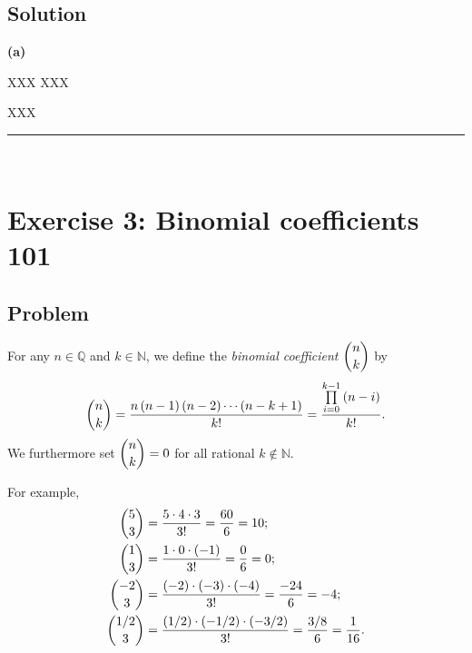 \documentclass[paper=a4, fontsize=12pt]{scrartcl} %
\newcommand{\QQ}{\mathbb{Q}} %
\newcommand{\NN}{\mathbb{N}} %
\newcommand{\tup}[1]{\left( #1 \right)}
\newcommand{\horrule}[1]{\rule{\linewidth}{#1}} %
\let\prodnonlimits\prod
\renewcommand{\prod}{\prodnonlimits\limits}
\theoremstyle{plainsl}
\theoremstyle{definition}
\theoremstyle{remark}
\begin{document}
\subsection{Solution}

\textbf{(a)} 

XXX
XXX

XXX

\horrule{0.3pt} \\[0.4cm]

\section{Exercise 3: Binomial coefficients 101}

\subsection{Problem}

For any $n \in \QQ$ and $k \in \NN$, we define the
\textit{binomial coefficient} $\dbinom{n}{k}$ by
\[
\dbinom{n}{k}
= \dfrac{ n \tup{n-1} \tup{n-2} \cdots \tup{n-k+1} }{k!}
= \dfrac{ \prod_{i=0}^{k-1} \tup{n-i} }{k!} .
\]
We furthermore set $\dbinom{n}{k} = 0$ for all rational
$k \notin \NN$.

For example,
\begin{align*}
\dbinom{5}{3} &= \dfrac{5 \cdot 4 \cdot 3}{3!} = \dfrac{60}{6} = 10; \\
\dbinom{1}{3} &= \dfrac{1 \cdot 0 \cdot \tup{-1}}{3!} = \dfrac{0}{6} = 0; \\
\dbinom{-2}{3} &= \dfrac{\tup{-2} \cdot \tup{-3} \cdot \tup{-4}}{3!} = \dfrac{-24}{6} = -4; \\
\dbinom{1/2}{3} &= \dfrac{\tup{1/2} \cdot \tup{-1/2} \cdot \tup{-3/2}}{3!} = \dfrac{3/8}{6} = \dfrac{1}{16}.
\end{align*}
\end{document}
